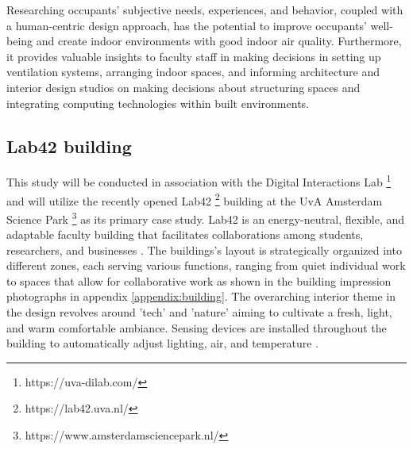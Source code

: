 Researching occupants' subjective needs, experiences, and behavior, coupled with a human-centric design approach, has the potential to improve occupants' well-being and create indoor environments with good indoor air quality. Furthermore, it provides valuable insights to faculty staff in making decisions in setting up ventilation systems, arranging indoor spaces, and informing architecture and interior design studios on making decisions about structuring spaces and integrating computing technologies within built environments.

\subsection{Lab42 building}

This study will be conducted in association with the Digital Interactions Lab \footnote{https://uva-dilab.com/} and will utilize the recently opened Lab42 \footnote{https://lab42.uva.nl/} building at the UvA Amsterdam Science Park \footnote{https://www.amsterdamsciencepark.nl/} as its primary case study. Lab42 is an energy-neutral, flexible, and adaptable faculty building that facilitates collaborations among students, researchers, and businesses \cite{crouwel}. The buildings's layout is strategically organized into different zones, each serving various functions, ranging from quiet individual work to spaces that allow for collaborative work as shown in the building impression photographs in appendix \ref{appendix:building}. The overarching interior theme in the design revolves around 'tech' and 'nature' aiming to cultivate a fresh, light, and warm comfortable ambiance. Sensing devices are installed throughout the building to automatically adjust lighting, air, and temperature \cite{faculty}.